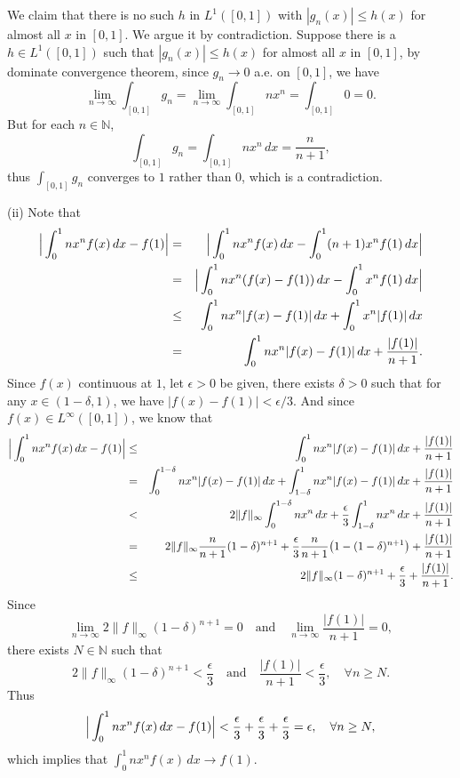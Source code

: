 \documentclass[12pt,a4paper]{ctexart}
\begin{document}
We claim that there is no such $h$ in $L^1([0,1])$ with $|g_n(x)| \leq h(x)$ for almost all $x$ in $[0,1]$. We argue it by contradiction. Suppose there is a $h \in L^1([0,1])$ such that $|g_n(x)| \leq h(x)$ for almost all $x$ in $[0,1]$, by dominate convergence theorem, since $g_n \to 0$ a.e. on $[0,1]$, we have
$$\lim_{n \to \infty} \int_{[0,1]} g_n  = \lim_{n \to \infty} \int_{[0,1]} n x^n = \int_{[0,1]} 0 = 0.$$
But for each $n \in \mathbb N$,
$$\int_{[0,1]} g_n  = \int_{[0,1]} n x^n \, d x = \frac{n}{n+1},$$
thus $\int_{[0,1]} g_n$ converges to $1$ rather than $0$, which is a contradiction.

\vspace{6pt}

(ii) Note that
\begin{eqnarray*}
    \Big{|} \int_0^1 n x^n f(x) \, d x - f(1)  \Big{|} & = &  \Big{|} \int_0^1 n x^n f(x) \, d x - \int_0^1 (n+1) x^n f(1) \, d x  \Big{|} \\
    & = & \Big{|} \int_0^1 n x^n (f(x) - f(1)) \, d x - \int_0^1 x^n f(1) \, d x  \Big{|} \\
    & \leq & \int_0^1 n x^n |f(x) - f(1)| \, d x + \int_0^1 x^n |f(1)| \, d x \\  
    & = & \int_0^1 n x^n |f(x) - f(1)| \, d x + \frac{|f(1)|}{n+1}. 
\end{eqnarray*}
Since $f(x)$ continuous at $1$, let $\epsilon > 0$ be given, there exists $\delta > 0$ such that for any $x \in (1 - \delta, 1)$, we have $|f(x) - f(1)| < \epsilon/3$. And since $f(x) \in L^{\infty}([0,1])$, we know that
\begin{eqnarray*}
    \Big{|} \int_0^1 n x^n f(x) \, d x - f(1)  \Big{|} & \leq &  \int_0^1 n x^n |f(x) - f(1)| \, d x + \frac{|f(1)|}{n+1} \\
    & = & \int_{0}^{1- \delta} n x^n |f(x) - f(1)| \, d x + \int_{1 - \delta}^{1} n x^n |f(x) - f(1)| \, d x +  \frac{|f(1)|}{n+1} \\
    & < & 2 \|f\|_{\infty} \int_{0}^{1- \delta} n x^n \, d x + \frac{\epsilon}{3}  \int_{1 - \delta}^{1} n x^n \, d x +  \frac{|f(1)|}{n+1} \\  
    & = & 2 \|f\|_{\infty} \frac{n}{n+1} (1 - \delta)^{n+1} + \frac{\epsilon}{3} \frac{n}{n+1} \big{(} 1 - (1 - \delta)^{n+1} \big{)} + \frac{|f(1)|}{n+1} \\
    & \leq &  2 \|f\|_{\infty} (1 - \delta)^{n+1} + \frac{\epsilon}{3} + \frac{|f(1)|}{n+1}.
\end{eqnarray*}
Since
$$\lim_{n \to \infty}  2 \|f\|_{\infty} (1 - \delta)^{n+1} = 0 \quad \text{and} \quad \lim_{n \to \infty} \frac{|f(1)|}{n+1} = 0, $$
there exists $N \in \mathbb N$ such that
$$2 \|f\|_{\infty} (1 - \delta)^{n+1} < \frac{\epsilon}{3} \quad \text{and} \quad \frac{|f(1)|}{n+1} < \frac{\epsilon}{3}, \quad \forall n \geq N.$$
Thus 
$$\Big{|} \int_0^1 n x^n f(x) \, d x - f(1)  \Big{|} < \frac{\epsilon}{3} + \frac{\epsilon}{3} + \frac{\epsilon}{3} = \epsilon, \quad \forall n \geq N,$$
which implies that $ \int_0^1 n x^n f(x) \, d x \to f(1)$.
\end{document}

